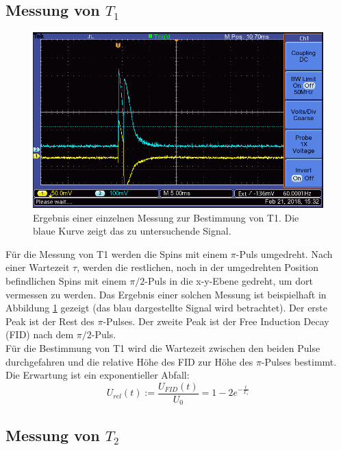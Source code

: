 \documentclass[12pt,a4paper]{article}
\begin{document}
\subsection{Messung von $T_1$}

\begin{figure}
\centering
\includegraphics[scale=0.8]{Bilder/F0003TEK.PNG}
\caption{Ergebnis einer einzelnen Messung zur Bestimmung von T1. Die blaue Kurve zeigt das zu untersuchende Signal.}
\label{fig:MessungT1_Beispiel}
\end{figure}

Für die Messung von T1 werden die Spins mit einem $\pi$-Puls umgedreht. Nach einer Wartezeit $\tau$, werden die restlichen, noch in der umgedrehten Position befindlichen Spins mit einem $\pi /2$-Puls in die x-y-Ebene gedreht, um dort vermessen zu werden. Das Ergebnis einer solchen Messung ist beispielhaft in Abbildung \ref{fig:MessungT1_Beispiel} gezeigt (das blau dargestellte Signal wird betrachtet). Der erste Peak ist der Rest des $\pi$-Pulses. Der zweite Peak ist der Free Induction Decay (FID) nach dem $\pi /2$-Puls. \\
Für die Bestimmung von T1 wird die Wartezeit zwischen den beiden Pulse durchgefahren und die relative Höhe des FID zur Höhe des $\pi$-Pulses bestimmt. Die Erwartung ist ein exponentieller Abfall:
\begin{equation}
\label{eq:T1_Exponentialfunktion}
U_{rel} (t) := \dfrac{U_{FID} (t)}{U_0} = 1 - 2 e^{-\frac{t}{T_1}}
\end{equation}


\subsection{Messung von $T_2$}
\end{document}
